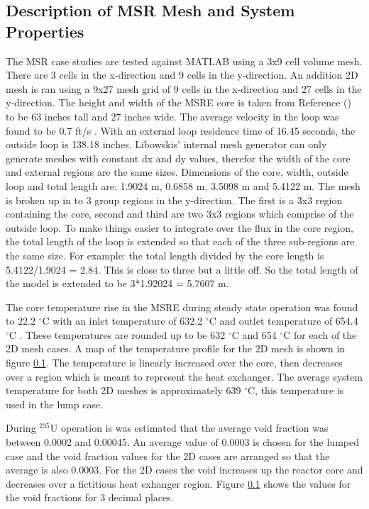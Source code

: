 \clearpage

\subsection{Description of MSR Mesh and System Properties}
The MSR case studies are tested against MATLAB using a 3x9 cell volume mesh. There are 3 cells in the x-direction and 9 cells in the y-direction. An addition 2D mesh is ran using a 9x27 mesh grid of 9 cells in the x-direction and 27 cells in the y-direction. The height and width of the MSRE core is taken from Reference (\cite{haubenreich1964}) to be 63 inches tall and 27 inches wide. The average velocity in the loop was found to be 0.7 ft/s \cite{kedl1972}. With an external loop residence time of 16.45 seconds, the outside loop is 138.18 inches. Libowskis' internal mesh generator can only generate meshes with constant dx and dy values, therefor the width of the core and external regions are the same sizes. Dimensions of the core, width, outside loop and total length are: 1.9024 m, 0.6858 m, 3.5098 m and 5.4122 m. The mesh is broken up in to 3 group regions in the y-direction. The first is a 3x3 region containing the core, second and third are two 3x3 regions which comprise of the outside loop. To make things easier to integrate over the flux in the core region, the total length of the loop is extended so that each of the three sub-regions are the same size. For example: the total length divided by the core length is 5.4122/1.9024 = 2.84. This is close to three but a little off. So the total length of the model is extended to be 3*1.92024 = 5.7607 m. 

The core temperature rise in the MSRE during steady state operation was found to 22.2 $^{\circ}$C with an inlet temperature of 632.2 $^{\circ}$C and outlet temperature of 654.4 $^{\circ}$C \cite{engel1962}. These temperatures are rounded up to be 632 $^{\circ}$C and 654 $^{\circ}$C for each of the 2D mesh cases. A map of the temperature profile for the 2D mesh is shown in figure \ref{}. The temperature is linearly increased over the core, then decreases over a region which is meant to represent the heat exchanger. The average system temperature for both 2D meshes is approximately 639 $^{\circ}$C, this temperature is used in the lump case. 

During $^{235}$U operation is was estimated that the average void fraction was between 0.0002 and 0.00045. An average value of 0.0003 is chosen for the lumped case and the void fraction values for the 2D cases are arranged so that the average is also 0.0003. For the 2D cases the void increases up the reactor core and decreases over a fictitious heat exhanger region. Figure \ref{} shows the values for the void fractions for 3 decimal places.  


